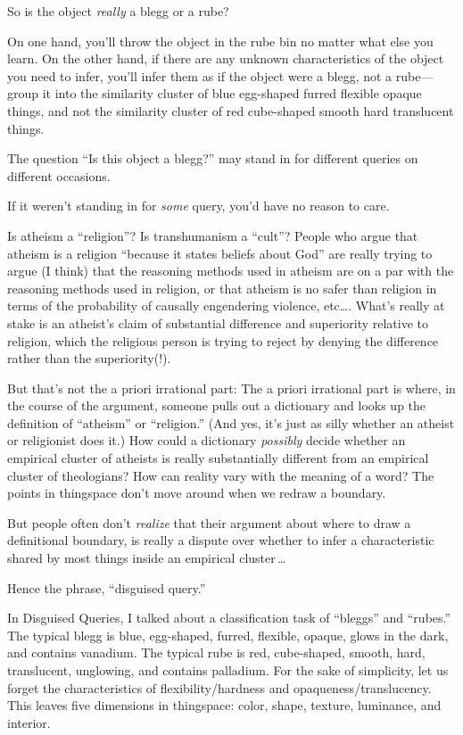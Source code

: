 { So is the object \textit{really} a blegg or a rube?


 On one hand, you'll throw the object in the rube
bin no matter what else you learn. On the other hand, if there are any
unknown characteristics of the object you need to infer,
you'll infer them as if the object were a blegg, not a
rube---group it into the similarity cluster of blue egg-shaped furred
flexible opaque things, and not the similarity cluster of red
cube-shaped smooth hard translucent things.


 The question ``Is this object a
blegg?'' may stand in for different queries on
different occasions.


 If it weren't standing in for \textit{some} query,
you'd have no reason to care.


 Is atheism a ``religion''? Is
transhumanism a ``cult''? People who
argue that atheism is a religion ``because it states
beliefs about God'' are really trying to argue (I
think) that the reasoning methods used in atheism are on a par with the
reasoning methods used in religion, or that atheism is no safer than
religion in terms of the probability of causally engendering violence,
etc\ldots. What's really at stake is an
atheist's claim of substantial difference and
superiority relative to religion, which the religious person is trying
to reject by denying the difference rather than the superiority(!).


 But that's not the a priori irrational part: The a
priori irrational part is where, in the course of the argument, someone
pulls out a dictionary and looks up the definition of
``atheism'' or
``religion.'' (And yes,
it's just as silly whether an atheist or religionist
does it.) How could a dictionary \textit{possibly} decide whether an
empirical cluster of atheists is really substantially different from an
empirical cluster of theologians? How can reality vary with the meaning
of a word? The points in thingspace don't move around
when we redraw a boundary.


 But people often don't \textit{realize} that their
argument about where to draw a definitional boundary, is really a
dispute over whether to infer a characteristic shared by most things
inside an empirical cluster\,\ldots


 Hence the phrase, ``disguised
query.''

\myendsectiontext



 In Disguised Queries, I talked about a classification task of
``bleggs'' and
``rubes.'' The typical blegg is
blue, egg-shaped, furred, flexible, opaque, glows in the dark, and
contains vanadium. The typical rube is red, cube-shaped, smooth, hard,
translucent, unglowing, and contains palladium. For the sake of
simplicity, let us forget the characteristics of flexibility/hardness
and opaqueness/translucency. This leaves five dimensions in thingspace:
color, shape, texture, luminance, and interior. 


}
